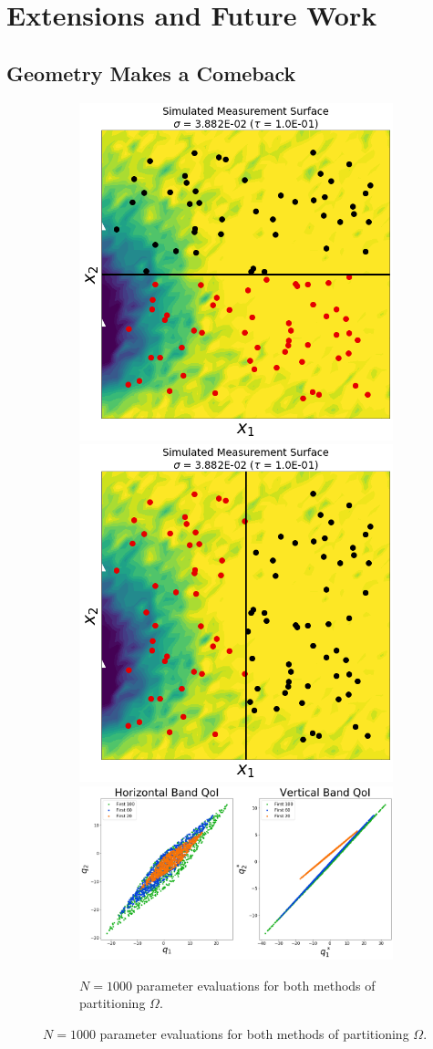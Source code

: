 \section{Extensions and Future Work}


\subsection{Geometry Makes a Comeback}

\begin{frame}[t]
\centering
\begin{figure}
\centering

\begin{figure}
\centering
  \includegraphics[width=0.25\linewidth]{figures/pde-highd_sensors_D2.png}
  \includegraphics[width=0.25\linewidth]{figures/pde-highd_sensors-alt_D2.png}
  \includegraphics[width=0.5\linewidth]{figures/pde-highd_geom_D2.png}
\caption{
$N=1000$ parameter evaluations for both methods of partitioning $\Omega$.
}
\label{fig:pde-highd-2d-geometry}
\end{figure}


\end{figure}

\end{frame}


